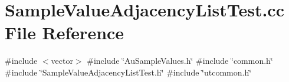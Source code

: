 \section{Sample\+Value\+Adjacency\+List\+Test.\+cc File Reference}
\label{SampleValueAdjacencyListTest_8cc}
{\ttfamily \#include $<$vector$>$}\newline
{\ttfamily \#include \char`\"{}Au\+Sample\+Values.\+h\char`\"{}}\newline
{\ttfamily \#include \char`\"{}common.\+h\char`\"{}}\newline
{\ttfamily \#include \char`\"{}Sample\+Value\+Adjacency\+List\+Test.\+h\char`\"{}}\newline
{\ttfamily \#include \char`\"{}utcommon.\+h\char`\"{}}\newline
